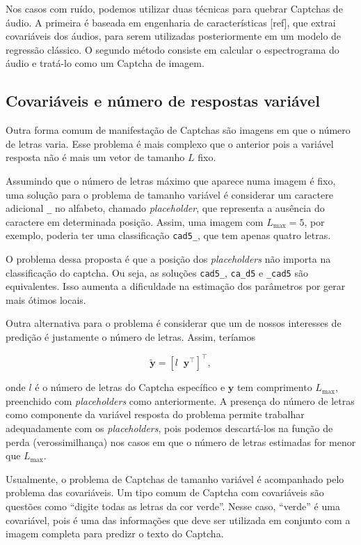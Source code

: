 \documentclass[12pt,]{report}
\begin{document}
Nos casos com ruído, podemos utilizar duas técnicas para quebrar
Captchas de áudio. A primeira é baseada em engenharia de características
{[}ref{]}, que extrai covariáveis dos áudios, para serem utilizadas
posteriormente em um modelo de regressão clássico. O segundo método
consiste em calcular o espectrograma do áudio e tratá-lo como um Captcha
de imagem.

\subsection{Covariáveis e número de respostas
variável}\label{covariaveis-e-numero-de-respostas-variavel}

Outra forma comum de manifestação de Captchas são imagens em que o
número de letras varia. Esse problema é mais complexo que o anterior
pois a variável resposta não é mais um vetor de tamanho \(L\) fixo.

Assumindo que o número de letras máximo que aparece numa imagem é fixo,
uma solução para o problema de tamanho variável é considerar um
caractere adicional \texttt{\_} no alfabeto, chamado \emph{placeholder},
que representa a ausência do caractere em determinada posição. Assim,
uma imagem com \(L_{\max} = 5\), por exemplo, poderia ter uma
classificação \texttt{cad5\_}, que tem apenas quatro letras.

O problema dessa proposta é que a posição dos \emph{placeholders} não
importa na classificação do captcha. Ou seja, as soluções
\texttt{cad5\_}, \texttt{ca\_d5} e \texttt{\_cad5} são equivalentes.
Isso aumenta a dificuldade na estimação dos parâmetros por gerar mais
ótimos locais.

Outra alternativa para o problema é considerar que um de nossos
interesses de predição é justamente o número de letras. Assim, teríamos

\[
\tilde{\mathbf{y}} = \left[l \;\; \mathbf y^\top \right]^\top,
\]

onde \(l\) é o número de letras do Captcha específico e \(\mathbf y\)
tem comprimento \(L_{\max}\), preenchido com \emph{placeholders} como
anteriormente. A presença do número de letras como componente da
variável resposta do problema permite trabalhar adequadamente com os
\emph{placeholders}, pois podemos descartá-los na função de perda
(verossimilhança) nos casos em que o número de letras estimadas for
menor que \(L_{\max}\).

Usualmente, o problema de Captchas de tamanho variável é acompanhado
pelo problema das covariáveis. Um tipo comum de Captcha com covariáveis
são questões como ``digite todas as letras da cor verde''. Nesse caso,
``verde'' é uma covariável, pois é uma das informações que deve ser
utilizada em conjunto com a imagem completa para predizr o texto do
Captcha.
\end{document}
